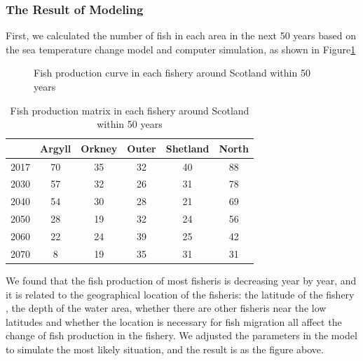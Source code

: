 \documentclass{mcmthesis}
\numberwithin{figure}{section}
\numberwithin{table}{section}
\begin{document}
\subsubsection{The Result of Modeling}
First, we calculated the number of fish in each area in the next 50 years based on the sea temperature change model and computer simulation, as shown in Figure\ref{FishProductionCurve}

\begin{figure}[tbp]
  \caption{Fish production curve in each fishery around Scotland within 50 years}\label{FishProductionCurve}
\end{figure}

\begin{table}[!htbp]
  \centering
  \begin{tabular}{|r|c|c|c|c|c|}%
  \hline  %
   & \textbf{Argyll} & \textbf{Orkney} & \textbf{Outer} & \textbf{Shetland} &\textbf{North}\\
  \hline %
  2017 & 70 &35 &32&40&88\\
  \hline %
  2030 & 57&32&26&31&78\\
  \hline %
  2040  & 54&30&28&21&69\\
  \hline %
  2050 &28&19&32&24&56\\
  \hline %
  2060 &22&24&39&25&42\\
  \hline %
  2070 &8&19&35&31&31\\
  \hline %
  \end{tabular}
  \caption{Fish production matrix in each fishery around Scotland within 50 years}
  \label{FisheryTable}
  \end{table}

We found that the fish production of most fisheris is decreasing year by year, and it is related to the geographical location of the fisheris: the latitude of the fishery , the depth of the water area, whether there are other fisheris near the low latitudes and  whether the location is necessary for fish migration all affect the change of fish production in the fishery. We adjusted the parameters in the model to simulate the most likely situation, and the result is as the figure above.
\end{document}
